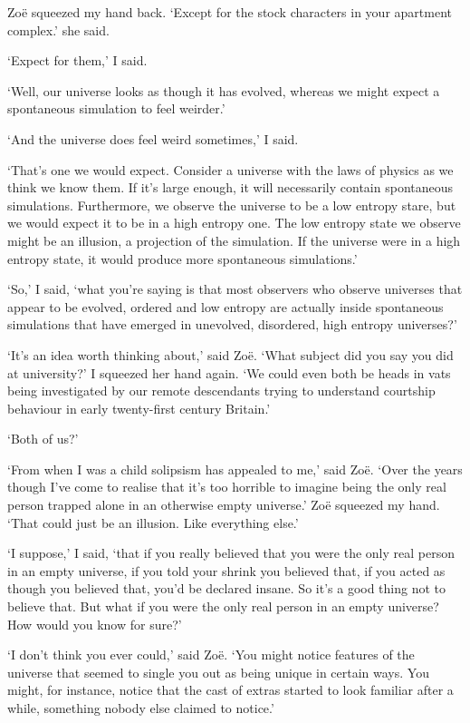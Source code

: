 Zoë squeezed my hand back. `Except for the stock characters in
your apartment complex.' she said.

`Expect for them,' I said.

`Well, our universe looks as though it has evolved, whereas we might
expect a spontaneous simulation to feel weirder.'

`And the universe does feel weird sometimes,' I said.

`That's one we would expect. Consider a universe with the laws of
physics as we think we know them. If it's large enough, it will
necessarily contain spontaneous simulations. Furthermore, we observe
the universe to be a low entropy stare, but we would expect it to be in
a high entropy one. The low entropy state we observe might be an
illusion, a projection of the simulation. If the universe were in a
high entropy state, it would produce more spontaneous simulations.'

`So,' I said, `what you're saying is that most observers who observe
universes that appear to be evolved, ordered and low entropy are
actually inside spontaneous simulations that have emerged in
unevolved, disordered, high entropy universes?'

`It's an idea worth thinking about,' said Zoë. `What subject did
you say you did at university?' I squeezed her hand again. `We
could even both be heads in vats being investigated by our remote
descendants trying to understand courtship behaviour in early
twenty-first century Britain.'

`Both of us?'

`From when I was a child solipsism has appealed to me,' said
Zoë. `Over the years though I've come to realise that it's too
horrible to imagine being the only real person trapped alone in an
otherwise empty universe.' Zoë squeezed my hand. `That could
just be an illusion. Like everything else.'

`I suppose,' I said, `that if you really believed that you were the
only real person in an empty universe, if you told your shrink you
believed that, if you acted as though you believed that, you'd be
declared insane. So it's a good thing not to believe that. But what
if you were the only real person in an empty universe? How would you
know for sure?'

`I don't think you ever could,' said Zoë. `You might notice
features of the universe that seemed to single you out as being
unique in certain ways. You might, for instance, notice that the
cast of extras started to look familiar after a while, something
nobody else claimed to notice.'

